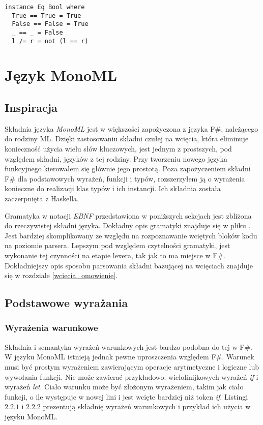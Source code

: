 \documentclass[declaration,shortabstract]{iithesis}
\begin{document}
\begin{lstlisting}[frame=lines]
instance Eq Bool where
  True == True = True 
  False == False = True 
  _ == _ = False
  l /= r = not (l == r)
\end{lstlisting}

\chapter{Język MonoML}

\section{Inspiracja}
Składnia języka \textit{MonoML} jest w większości zapożyczona z języka F\#, należącego
do rodziny ML. Dzięki zastosowaniu składni czułej na wcięcia, która eliminuje 
konieczność użycia wielu słów kluczowych, jest jednym z prostszych, pod względem 
składni, języków z tej rodziny. Przy tworzeniu nowego języka funkcyjnego kierowałem się głównie 
jego prostotą. Poza zapożyczeniem składni F\# dla podstawowych wyrażeń,
funkcji i typów, rozszerzyłem ją o wyrażenia konieczne do realizacji klas 
typów i ich instancji. Ich składnia została zaczerpnięta z Haskella.

Gramatyka w notacji \textit{EBNF} przedstawiona w poniższych sekcjach 
jest zbliżona do rzeczywistej składni języka.
Dokładny opis gramatyki znajduje się w pliku 
. Jest bardziej skomplikowany
ze względu na rozpoznawanie wciętych bloków kodu na
poziomie parsera. Lepszym pod względem czytelności gramatyki, 
jest wykonanie tej czynności na etapie lexera, tak jak to ma miejsce w F\#.
Dokładniejszy opis 
sposobu parsowania składni bazującej na wcięciach znajduje się w rozdziale 
\ref{wciecia_omowienie}. 

\section{Podstawowe wyrażania}

\subsection{Wyrażenia warunkowe}

Składnia i semantyka wyrażeń warunkowych jest bardzo podobna do tej w F\#. W 
języku MonoML
istnieją jednak pewne uproszczenia względem F\#. 
Warunek musi być prostym wyrażeniem zawierającym operacje arytmetyczne i 
logiczne lub wywołania funkcji. Nie może zawierać przykładowo:
wielolinijkowych wyrażeń \textit{if} i wyrażeń \textit{let}. 
Ciało warunku może być złożonym wyrażeniem, takim jak 
ciało funkcji, o ile występuje w nowej lini i jest wcięte bardziej niż 
token \textit{if}. Listingi $2.2.1$ i $2.2.2$ prezentują składnię wyrażeń 
warunkowych i przykład ich użycia w języku MonoML.
\end{document}
